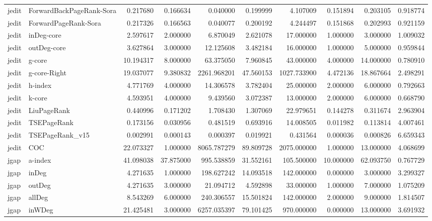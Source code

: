 \begin{tabular}{llrrrrrrrr}
jedit & ForwardBackPageRank-Sora & 0.217680 & 0.166634 & 0.040000 & 0.199999 & 4.107009 & 0.151894 & 0.203105 & 0.918774 \\
jedit & ForwardPageRank-Sora & 0.217326 & 0.166563 & 0.040077 & 0.200192 & 4.244497 & 0.151868 & 0.202993 & 0.921159 \\
jedit & inDeg-core & 2.597617 & 2.000000 & 6.870049 & 2.621078 & 17.000000 & 1.000000 & 3.000000 & 1.009032 \\
jedit & outDeg-core & 3.627864 & 3.000000 & 12.125608 & 3.482184 & 16.000000 & 1.000000 & 5.000000 & 0.959844 \\
jedit & g-core & 10.194317 & 8.000000 & 63.375050 & 7.960845 & 43.000000 & 4.000000 & 14.000000 & 0.780910 \\
jedit & g-core-Right & 19.037077 & 9.380832 & 2261.968201 & 47.560153 & 1027.733900 & 4.472136 & 18.867664 & 2.498291 \\
jedit & h-index & 4.771769 & 4.000000 & 14.306578 & 3.782404 & 25.000000 & 2.000000 & 6.000000 & 0.792663 \\
jedit & k-core & 4.593951 & 4.000000 & 9.439560 & 3.072387 & 13.000000 & 2.000000 & 6.000000 & 0.668790 \\
jedit & LiuPageRank & 0.440996 & 0.171202 & 1.708430 & 1.307069 & 22.979651 & 0.144278 & 0.311674 & 2.963904 \\
jedit & TSEPageRank & 0.173156 & 0.030956 & 0.481519 & 0.693916 & 14.008505 & 0.011982 & 0.113814 & 4.007461 \\
jedit & TSEPageRank_v15 & 0.002991 & 0.000143 & 0.000397 & 0.019921 & 0.431564 & 0.000036 & 0.000826 & 6.659343 \\
jedit & COC & 22.073327 & 1.000000 & 8065.787279 & 89.809728 & 2075.000000 & 1.000000 & 13.000000 & 4.068699 \\
jgap & a-index & 41.098038 & 37.875000 & 995.538859 & 31.552161 & 105.500000 & 10.000000 & 62.093750 & 0.767729 \\
jgap & inDeg & 4.271635 & 1.000000 & 198.627242 & 14.093518 & 142.000000 & 0.000000 & 3.000000 & 3.299327 \\
jgap & outDeg & 4.271635 & 3.000000 & 21.094712 & 4.592898 & 33.000000 & 1.000000 & 7.000000 & 1.075209 \\
jgap & allDeg & 8.543269 & 6.000000 & 240.306557 & 15.501824 & 142.000000 & 2.000000 & 9.000000 & 1.814507 \\
jgap & inWDeg & 21.425481 & 3.000000 & 6257.035397 & 79.101425 & 970.000000 & 0.000000 & 13.000000 & 3.691932 \\

\end{tabular}
